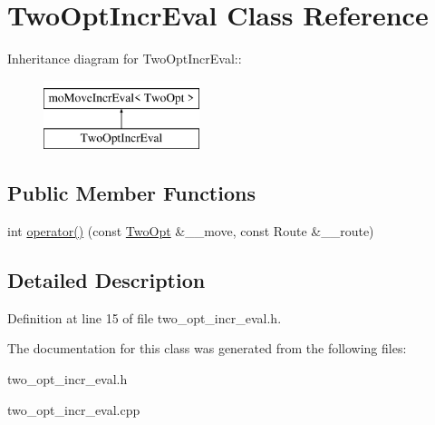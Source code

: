 \hypertarget{classTwoOptIncrEval}{
\section{Two\-Opt\-Incr\-Eval Class Reference}
\label{classTwoOptIncrEval}
}
Inheritance diagram for Two\-Opt\-Incr\-Eval::\begin{figure}[H]
\begin{center}
\leavevmode
\includegraphics[height=2cm]{classTwoOptIncrEval}
\end{center}
\end{figure}
\subsection*{Public Member Functions}
\begin{CompactItemize}
\item 
\hypertarget{classTwoOptIncrEval_48500077e651c4c6152daef8a396be39}{
int \hyperlink{classTwoOptIncrEval_48500077e651c4c6152daef8a396be39}{operator()} (const \hyperlink{classTwoOpt}{Two\-Opt} \&\_\-\_\-move, const Route \&\_\-\_\-route)}
\label{classTwoOptIncrEval_48500077e651c4c6152daef8a396be39}

\end{CompactItemize}


\subsection{Detailed Description}




Definition at line 15 of file two\_\-opt\_\-incr\_\-eval.h.

The documentation for this class was generated from the following files:\begin{CompactItemize}
\item 
two\_\-opt\_\-incr\_\-eval.h\item 
two\_\-opt\_\-incr\_\-eval.cpp\end{CompactItemize}
